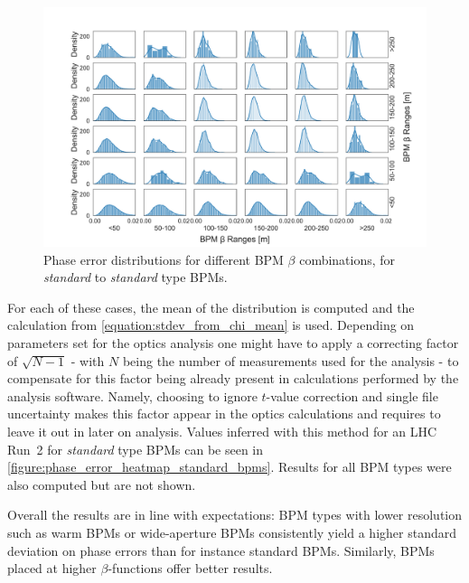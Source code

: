 \begin{figure}[!htb]
    \centering
    \includegraphics*[width=\textwidth]{Figures/Other_Studies/phase_grid_distributions_errors_standard_standard.pdf}
    \caption{Phase error distributions for different BPM \(\beta\) combinations, for \textit{standard} to \textit{standard} type BPMs.}
    \label{figure:grid_distributions_standard_standard}
\end{figure}

For each of these cases, the mean of the distribution is computed and the calculation from \cref{equation:stdev_from_chi_mean} is used.
Depending on parameters set for the optics analysis one might have to apply a correcting factor of \(\sqrt{N-1}\) - with \(N\) being the number of measurements used for the analysis - to compensate for this factor being already present in calculations performed by the analysis software.
Namely, choosing to ignore \(t\)-value correction and single file uncertainty makes this factor appear in the optics calculations and requires to leave it out in later on analysis.
Values inferred with this method for an LHC Run~\num{2} for \textit{standard} type BPMs can be seen in \cref{figure:phase_error_heatmap_standard_bpms}.
Results for all BPM types were also computed but are not shown.%

Overall the results are in line with expectations: BPM types with lower resolution such as warm BPMs or wide-aperture BPMs consistently yield a higher standard deviation on phase errors than for instance standard BPMs.
Similarly, BPMs placed at higher \(\beta\)-functions offer better results.

